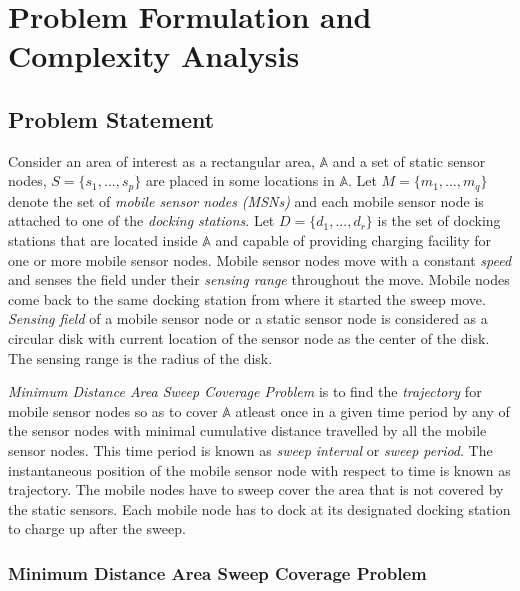 \chapter{Problem Formulation and Complexity Analysis}
\section{Problem Statement}
Consider an area of interest as a rectangular area, $\mathbb{A}$ and a set of static sensor nodes, $S=\{ s_1,...,s_p \}$ are placed in some locations in $\mathbb{A}$. Let $M=\{ m_1,...,m_q \}$ denote the set of \textit{mobile sensor nodes (MSNs)} and each mobile sensor node is attached to one of the \textit{docking  stations}. Let $D=\{ d_1,...,d_r \}$ is the set of docking stations that are located inside $\mathbb{A}$ and capable of providing charging facility for one or more mobile sensor nodes. Mobile sensor nodes move with a constant \textit{speed} and senses the field under their \textit{sensing range} throughout the move. Mobile nodes come back to the same docking station from where it started the sweep move. \textit{Sensing field} of a mobile sensor node or a static sensor node is considered as a circular disk with current location of the sensor node as the center of  the disk. The sensing range is the radius of the disk.

\textit{Minimum Distance Area Sweep Coverage Problem} is to find the \textit{trajectory} for mobile sensor nodes so as to cover $\mathbb{A}$ atleast once in a given time period by any of the sensor nodes  with minimal cumulative distance travelled by all the mobile sensor nodes. This time period is known as \textit{sweep interval} or  \textit{sweep period}. The instantaneous position of the mobile sensor node with respect to time is known as trajectory. The mobile nodes have to sweep cover the area that is not covered by the static sensors. Each mobile node has to dock at its designated docking station to charge up after the sweep.

\subsection{Minimum Distance Area Sweep Coverage Problem}


